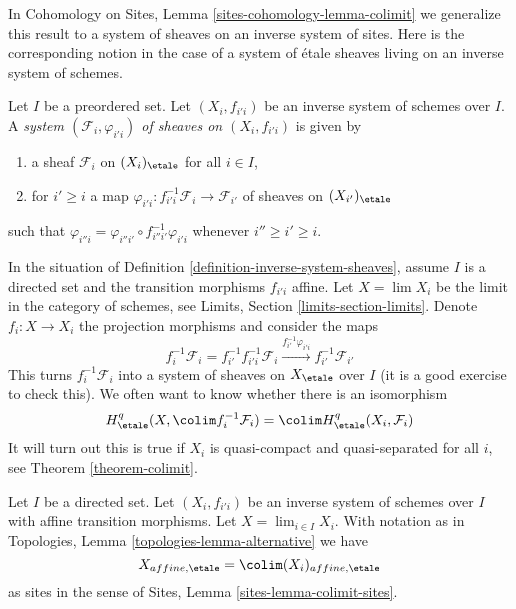 \medskip\noindent
In Cohomology on Sites, Lemma \ref{sites-cohomology-lemma-colimit}
we generalize this result to a system of sheaves
on an inverse system of sites. Here is the corresponding
notion in the case of a system of \'etale sheaves living
on an inverse system of schemes.

\begin{definition}
\label{definition-inverse-system-sheaves}
Let $I$ be a preordered set. Let $(X_i, f_{i'i})$ be an inverse
system of schemes over $I$.
A {\it system $(\mathcal{F}_i, \varphi_{i'i})$ of sheaves
on $(X_i, f_{i'i})$} is given by
\begin{enumerate}
\item a sheaf $\mathcal{F}_i$ on $(X_i)_\etale$ for all $i \in I$,
\item for $i' \geq i$ a map
$\varphi_{i'i} : f_{i'i}^{-1}\mathcal{F}_i \to \mathcal{F}_{i'}$
of sheaves on $(X_{i'})_\etale$
\end{enumerate}
such that $\varphi_{i''i} = \varphi_{i''i'} \circ f_{i'' i'}^{-1}\varphi_{i'i}$
whenever $i'' \geq i' \geq i$.
\end{definition}

\noindent
In the situation of Definition \ref{definition-inverse-system-sheaves},
assume $I$ is a directed set and the transition morphisms $f_{i'i}$ affine.
Let $X = \lim X_i$ be the limit in the category of schemes, see
Limits, Section \ref{limits-section-limits}.
Denote $f_i : X \to X_i$ the projection morphisms and consider the maps
$$
f_i^{-1}\mathcal{F}_i = f_{i'}^{-1}f_{i'i}^{-1}\mathcal{F}_i
\xrightarrow{f_{i'}^{-1}\varphi_{i'i}}
f_{i'}^{-1}\mathcal{F}_{i'}
$$
This turns $f_i^{-1}\mathcal{F}_i$ into a system of sheaves on $X_\etale$
over $I$ (it is a good exercise to check this).
We often want to know whether there is an isomorphism
$$
H^q_\etale(X, \colim f_i^{-1}\mathcal{F}_i) =
\colim H^q_\etale(X_i, \mathcal{F}_i)
$$
It will turn out this is true if $X_i$ is quasi-compact and quasi-separated
for all $i$, see Theorem \ref{theorem-colimit}.

\begin{lemma}
\label{lemma-colimit-affine-sites}
Let $I$ be a directed set. Let $(X_i, f_{i'i})$ be an inverse
system of schemes over $I$ with affine transition morphisms.
Let $X = \lim_{i \in I} X_i$. With
notation as in Topologies, Lemma \ref{topologies-lemma-alternative} we have
$$
X_{affine, \etale} = \colim (X_i)_{affine, \etale}
$$
as sites in the sense of
Sites, Lemma \ref{sites-lemma-colimit-sites}.
\end{lemma}

